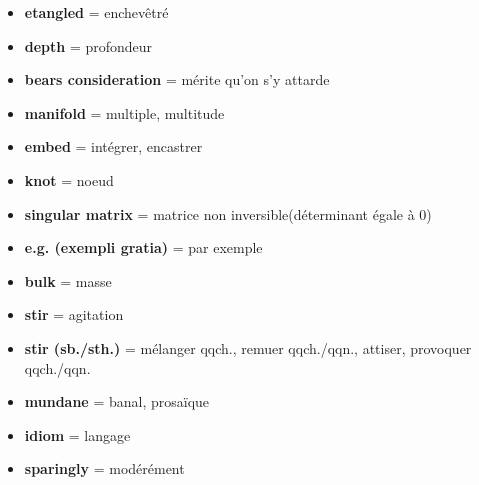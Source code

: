 \documentclass[french]{article}
\begin{document}
\begin{itemize}[label=\textbullet]
	\item \textbf{etangled} = enchevêtré
	\item \textbf{depth} = profondeur
	\item \textbf{bears consideration} = mérite qu'on s'y attarde
	\item \textbf{manifold} = multiple, multitude
	\item \textbf{embed} = intégrer, encastrer
	\item \textbf{knot} = noeud
	\item \textbf{singular matrix} = matrice non inversible(déterminant égale à 0)
	\item \textbf{e.g. (exempli gratia)} = par exemple
	\item \textbf{bulk} = masse
	\item \textbf{stir} = agitation
	\item \textbf{stir (sb./sth.)} = mélanger qqch., remuer qqch./qqn., attiser, provoquer qqch./qqn.
	\item \textbf{mundane} = banal, prosaïque
	\item \textbf{idiom} = langage
	\item \textbf{sparingly} = modérément \\
\end{itemize}
\end{document}
